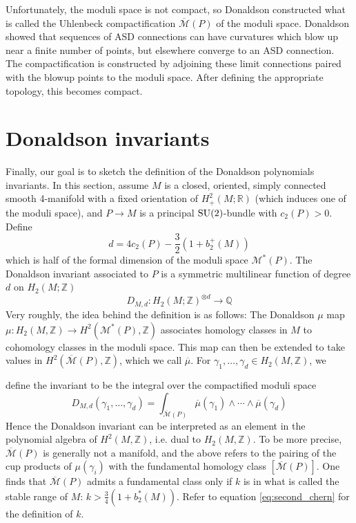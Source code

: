 Unfortunately, the moduli space is not compact, so Donaldson constructed what is
called the Uhlenbeck compactification $\overline{\mathcal{M}}(P)$ of the
moduli space. Donaldson showed that sequences of ASD connections can have
curvatures which blow up near a finite number of points, but elsewhere converge
to an ASD connection. The compactification is constructed by adjoining these
limit connections paired with the blowup points to the moduli space. After
defining the appropriate topology, this becomes compact.

\section{Donaldson invariants}
Finally, our goal is to sketch the definition of the Donaldson polynomials
invariants. 
In this section, assume $M$ is a closed,
oriented, simply connected smooth 4-manifold with a fixed orientation of
$H^2_+(M;\mathbb{R})$ (which induces one of the moduli space), and 
$P\to M$ is a principal $\operatorname{SU}(2)$-bundle with  $c_2(P) > 0$. Define 
\[
d = 4c_2(P) - \frac{3}{2}(1+b_2^+(M))
\] 
which is half of the formal dimension of the moduli space
$\mathcal{M}^*(P)$. The Donaldson invariant associated to $P$ is a
symmetric multilinear function of degree  $d$ on $H_2(M;\mathbb{Z})$ 
\[
D_{M,d} : H_2(M;\mathbb{Z})^{\otimes d} \to \mathbb{Q}
\] 
Very roughly, the idea behind the definition is as follows: The Donaldson $\mu$ 
map $\mu: H_2(M,\mathbb{Z}) \to H^2(\mathcal{M}^*(P),\mathbb{Z})$ associates
homology classes in $M$ to cohomology classes in the moduli space. 
This map can then be extended to take values in
$H^2(\overline{\mathcal{M}}(P),\mathbb{Z})$, which we call $\overline{\mu}$.
For $\gamma_1,\ldots,\gamma_d \in H_2(M,\mathbb{Z})$, we 
\begin{comment}
have $\overline{\mu}(\gamma_1),\ldots,\overline{\mu}(\gamma_d)\in 
H^2(\overline{\mathcal{M}}(P),\mathbb{Z})$ and we 
\end{comment}
define the invariant to be the integral over the compactified moduli space
 \[
D_{M,d}(\gamma_1,\ldots,\gamma_d) 
= \int_{\overline{\mathcal{M}}(P)} \overline{\mu}(\gamma_1)\wedge \cdots\wedge
\overline{\mu}(\gamma_d)
\] 
Hence the Donaldson invariant can be interpreted as 
an element in the polynomial algebra of $H^2(M,\mathbb{Z})$, i.e. dual to
$H_2(M,\mathbb{Z})$.  
To be more precise, $\overline{\mathcal{M}}(P)$ is generally not a manifold, and the above
refers to the pairing of the cup products of $\mathcal{\mu}(\gamma_i)$ with the 
fundamental homology class $[\overline{\mathcal{M}}(P)]$. One finds that
$\overline{\mathcal{M}}(P)$ admits a fundamental class only if $k$ is in what is 
called the stable range of $M$:  $k > \frac{3}{4}(1+b_2^*(M))$. 
Refer to equation \ref{eq:second_chern} for the definition of $k$.

